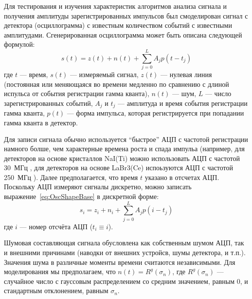 Для тестирования и изучения характеристик алгоритмов анализа сигнала и получения амплитуды зарегистрированных импульсов был смоделирован сигнал с детектора (осциллограмма) с известным количеством событий с известными амплитудами. Сгенерированная осциллограмма может быть описана следующей формулой:
\begin{equation}
  \label{eq:OscShapeBase}
  s(t) = z(t) + n(t) + \sum\limits_{j = 0}^{L} A_j p(t-t_j)
\end{equation}
где $t$ --- время, $s(t)$ --- измеряемый сигнал, $z(t)$ --- нулевая линия (постоянная или меняющаяся во времени медленно по сравнению с длиной испульса от события регистрации гамма кванта), $n(t)$ --- шум, $L$ --- число зарегистрированных событий, $A_j$ и $t_j$ --- амплитуда и время события регистрации гамма кванта, $p(t)$ --- форма импульса, которая регистрируется при попадании гамма кванта в детектор. 

Для записи сигнала обычно используется ``быстрое'' АЦП с частотой регистрации намного болше, чем характерные времена роста и спада импульа (например, для детекторов на основе кристаллов NaI(Ti) можно использовать АЦП с частотой 30~МГц \cite{Shevelev2004}, для детекторов на основе LaBr3(Ce) испоьзуются АЦП с частотой 250~МГц \cite{Shevelev2014,Shevelev2018,Khilkevitch2020}). Далее предполагается, что время $t$ указано в отсчетах АЦП. Поскольку АЦП измеряют сигналы дискретно, можно записать выражение~\ref{eq:OscShapeBase} в дискретной форме:
\begin{equation*}
  s_i = z_i + n_i + \sum\limits_{j = 0}^{L} A_j p(i-t_j)
\end{equation*}
где $i$ --- номер отсчёта АЦП ($ t_i \equiv i $).

Шумовая составляющая сигнала обусловлена как собственным шумом АЦП, так и внешними причинами (наводки от внешних устройсв, шумы детектора, и т.п.). Значения шума в различные моменты времени считаются независимыми. Для моделирования мы предполагаем, что $n(t) = R^g( \sigma_n )$, где $R^g(\sigma_n)$ --- случайное число с гауссовым распределением со средним значением, равным 0, и стандартным отклонением, равным $\sigma_n$.


